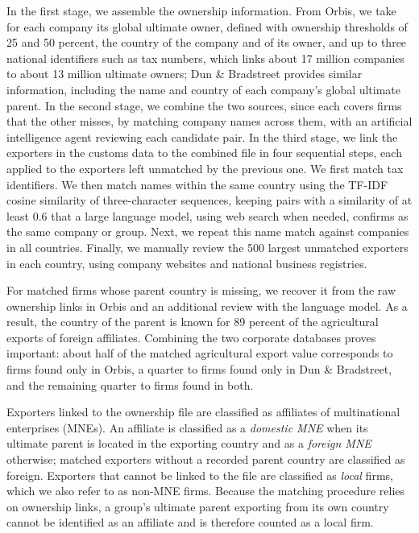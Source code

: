 \documentclass[11pt,a4paper]{article}
\begin{document}
In the first stage, we assemble the ownership information. From Orbis, we take for each company
its global ultimate owner, defined with ownership thresholds of 25 and 50 percent, the country of
the company and of its owner, and up to three national identifiers such as tax numbers, which links
about 17 million companies to about 13 million ultimate owners; Dun \& Bradstreet provides similar
information, including the name and country of each company's global ultimate parent. In the
second stage, we combine the two sources, since each covers firms that the other misses, by
matching company names across them, with an artificial intelligence agent reviewing each
candidate pair. In the third stage, we link the exporters in the customs data to the combined file
in four sequential steps, each applied to the exporters left unmatched by the previous one. We
first match tax identifiers. We then match names within the same country using the TF-IDF cosine
similarity of three-character sequences, keeping pairs with a similarity of at least 0.6 that a
large language model, using web search when needed, confirms as the same company or group. Next, we
repeat this name match against companies in all countries. Finally, we manually review the 500
largest unmatched exporters in each country, using company websites and national business
registries.

For matched firms whose parent country is missing, we recover it from the raw ownership links in
Orbis and an additional review with the language model. As a result, the country of the parent is
known for 89 percent of the agricultural exports of foreign affiliates. Combining the two
corporate databases proves important: about half of the matched agricultural export value
corresponds to firms found only in Orbis, a quarter to firms found only in Dun \& Bradstreet, and
the remaining quarter to firms found in both.

Exporters linked to the ownership file are classified as affiliates of multinational enterprises
(MNEs). An affiliate is classified as a \emph{domestic MNE} when its ultimate parent is located in
the exporting country and as a \emph{foreign MNE} otherwise; matched exporters without a recorded
parent country are classified as foreign. Exporters that cannot be linked to the file are
classified as \emph{local} firms, which we also refer to as non-MNE firms. Because the matching
procedure relies on ownership links, a group's ultimate parent exporting from its own country
cannot be identified as an affiliate and is therefore counted as a local firm.
\end{document}
